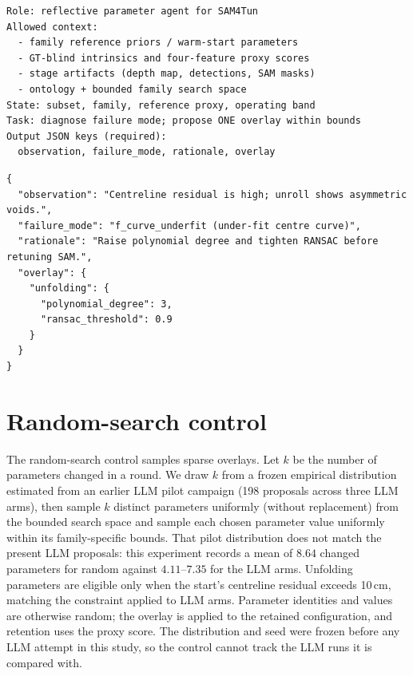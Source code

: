 \documentclass[a4paper,fleqn]{cas-dc}
\begin{document}
{\begin{lstlisting}[caption={Agent-prompt skeleton (per round).},label=lst:prompt-skeleton]
Role: reflective parameter agent for SAM4Tun
Allowed context:
  - family reference priors / warm-start parameters
  - GT-blind intrinsics and four-feature proxy scores
  - stage artifacts (depth map, detections, SAM masks)
  - ontology + bounded family search space
State: subset, family, reference proxy, operating band
Task: diagnose failure mode; propose ONE overlay within bounds
Output JSON keys (required):
  observation, failure_mode, rationale, overlay
\end{lstlisting}

\begin{lstlisting}[caption={Example JSON proposal returned by the agent.},label=lst:prompt-example]
{
  "observation": "Centreline residual is high; unroll shows asymmetric voids.",
  "failure_mode": "f_curve_underfit (under-fit centre curve)",
  "rationale": "Raise polynomial degree and tighten RANSAC before retuning SAM.",
  "overlay": {
    "unfolding": {
      "polynomial_degree": 3,
      "ransac_threshold": 0.9
    }
  }
}
\end{lstlisting}

\section{Random-search control}\label{app:random-search}

The random-search control samples sparse overlays. Let $k$ be the number of parameters changed in a round. We draw $k$ from a frozen empirical distribution estimated from an earlier LLM pilot campaign (198 proposals across three LLM arms), then sample $k$ distinct parameters uniformly (without replacement) from the bounded search space and sample each chosen parameter value uniformly within its family-specific bounds. That pilot distribution does not match the present LLM proposals: this experiment records a mean of $8.64$ changed parameters for random against $4.11$--$7.35$ for the LLM arms. Unfolding parameters are eligible only when the start's centreline residual exceeds 10\,cm, matching the constraint applied to LLM arms. Parameter identities and values are otherwise random; the overlay is applied to the retained configuration, and retention uses the proxy score. The distribution and seed were frozen before any LLM attempt in this study, so the control cannot track the LLM runs it is compared with.

}
\end{document}
